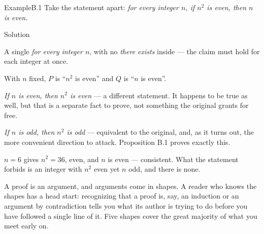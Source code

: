 \documentclass[a4paper,12pt,oneside]{memoir}
\begin{document}
\begin{workedexample}
\begin{envexample}{Example}{B.1}{}
Take the statement apart: \emph{for every integer \(n\), if \(n^{2}\) is even, then \(n\) is even.}
\end{envexample}
\begin{envsolution}{Solution}{}{}
\begin{sollist}
  \item {} A single \emph{for every integer \(n\)}, with no \emph{there exists} inside — the claim must hold for each integer at once.
  \item {} With \(n\) fixed, \(P\) is “\(n^{2}\) is even” and \(Q\) is “\(n\) is even”.
  \item {} \emph{If \(n\) is even, then \(n^{2}\) is even} — a different statement. It happens to be true as well, but that is a separate fact to prove, not something the original grants for free.
  \item {} \emph{If \(n\) is odd, then \(n^{2}\) is odd} — equivalent to the original, and, as it turns out, the more convenient direction to attack. Proposition B.1 proves exactly this.
  \item {} \(n = 6\) gives \(n^{2} = 36\), even, and \(n\) is even — consistent. What the statement forbids is an integer with \(n^{2}\) even yet \(n\) odd, and there is none.
\end{sollist}
\end{envsolution}
\end{workedexample}


A proof is an argument, and arguments come in shapes. A reader who knows the shapes has a head start: recognizing that a proof is, say, an induction or an argument by contradiction tells you what its author is trying to do before you have followed a single line of it. Five shapes cover the great majority of what you meet early on.
\end{document}
